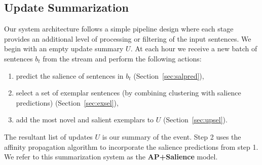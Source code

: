 \subsection{Update Summarization}

Our system architecture follows a simple pipeline design where each
stage provides an additional level of processing or filtering of the input
sentences.
We begin with an empty update summary $U$.
At each hour we receive a new batch of sentences $b_t$ from the stream
and perform the following actions:
\begin{enumerate}
    \item predict the salience of sentences in $b_t$ (Section~\ref{sec:salpred}),
  \item select a set of exemplar sentences (by combining clustering with 
      salience predictions) (Section~\ref{sec:exsel}),
  \item add the most novel and salient exemplars to $U$ (Section~\ref{sec:upsel}).
\end{enumerate}

The resultant list of updates $U$ is our summary of the event.
Step 2 uses the affinity propagation algorithm to incorporate the salience
predictions from step 1. We refer to this summarization 
system as the \textbf{AP+Salience} model.




